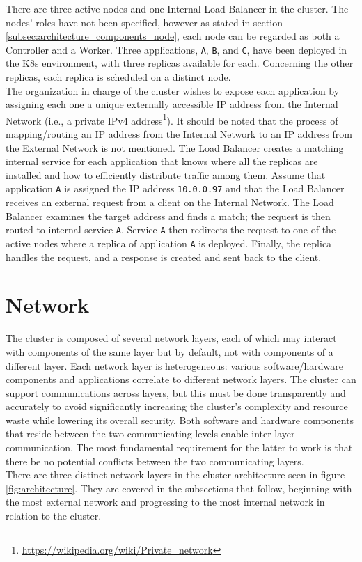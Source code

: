 There are three active nodes and one Internal Load Balancer in the cluster. The
nodes' roles have not been specified, however as stated in section
\ref{subsec:architecture_components_node}, each node can be regarded as both a Controller
and a Worker. Three applications, \texttt{A}, \texttt{B}, and \texttt{C}, have been
deployed in the K8s environment, with three replicas available for each. Concerning
the other replicas, each replica is scheduled on a distinct node. \\ %
The organization in charge of the cluster wishes to expose each application by
assigning each one a unique externally accessible IP address from the Internal
Network (i.e., a private IPv4 address\footnote{\url{https://wikipedia.org/wiki/Private_network}}).
It should be noted that the process of mapping/routing an IP address from the Internal
Network to an IP address from the External Network is not mentioned. The Load
Balancer creates a matching internal service for each application that knows
where all the replicas are installed and how to efficiently distribute traffic
among them. Assume that application \texttt{A} is assigned the IP address
\texttt{10.0.0.97} and that the Load Balancer receives an external request from a
client on the Internal Network. The Load Balancer examines the target address
and finds a match; the request is then routed to internal service \texttt{A}. Service
\texttt{A} then redirects the request to one of the active nodes where a replica
of application \texttt{A} is deployed. Finally, the replica handles the request,
and a response is created and sent back to the client.

\section{Network}
\label{sec:architecture_network}

The cluster is composed of several network layers, each of which may interact
with components of the same layer but by default, not with components of a different
layer. Each network layer is heterogeneous: various software/hardware components
and applications correlate to different network layers. The cluster can support
communications across layers, but this must be done transparently and accurately
to avoid significantly increasing the cluster's complexity and resource waste while
lowering its overall security. Both software and hardware components that reside
between the two communicating levels enable inter-layer communication. The most fundamental
requirement for the latter to work is that there be no potential conflicts between
the two communicating layers. \\ %
There are three distinct network layers in the cluster architecture seen in figure
\ref{fig:architecture}. They are covered in the subsections that follow, beginning
with the most external network and progressing to the most internal network in relation
to the cluster.

